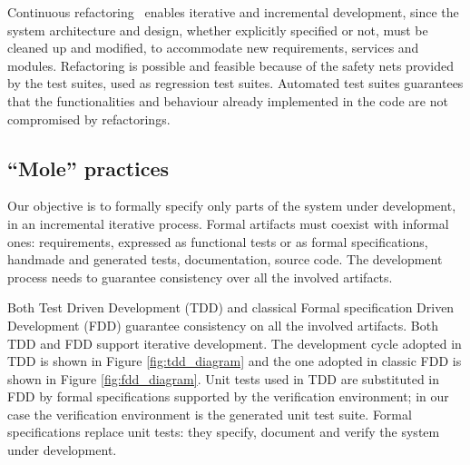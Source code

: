 \documentclass{article}
\begin{document}
Continuous refactoring~\cite{Fowler1999} enables iterative and incremental development, since the system architecture and design, whether explicitly specified or not, must be cleaned up and modified, to accommodate new requirements, services and modules.
Refactoring is possible and feasible because of the safety nets provided by the test suites, used as regression test suites.
Automated test suites guarantees that the functionalities and behaviour already implemented in the code are not compromised by refactorings.

\subsection{``Mole'' practices}

Our objective is to formally specify only parts of the system under development, in an incremental iterative process.
Formal artifacts must coexist with informal ones: requirements, expressed as functional tests or as formal specifications, handmade and generated tests, documentation, source code.
The development process needs to guarantee consistency over all the involved artifacts.

Both Test Driven Development (TDD) and classical Formal specification Driven Development (FDD) guarantee consistency on all the involved artifacts. 
Both TDD and FDD support iterative development.
The development cycle adopted in TDD is shown in Figure \ref{fig:tdd_diagram} and the one adopted in classic FDD is shown in Figure \ref{fig:fdd_diagram}.
Unit tests used in TDD are substituted  in FDD by formal specifications supported by the verification environment; in our case the verification environment is the generated unit test suite.
Formal specifications replace unit tests: they specify, document and verify the system under development.
\end{document}
